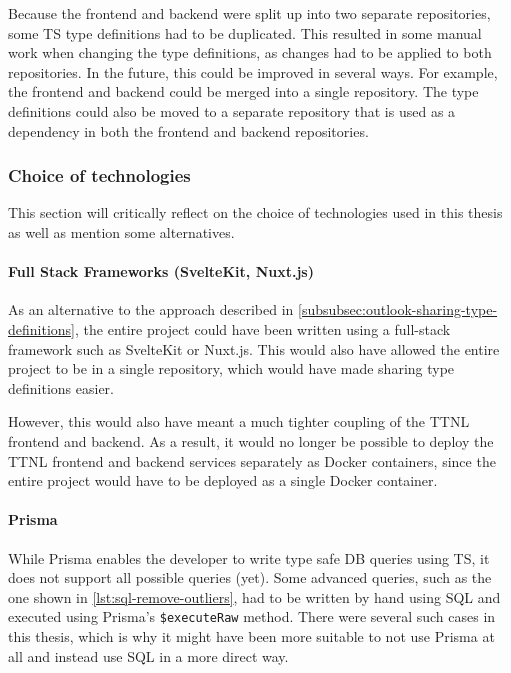 Because the frontend and backend were split up into two separate repositories, some \ac{TS} type definitions had to be duplicated.
This resulted in some manual work when changing the type definitions, as changes had to be applied to both repositories.
In the future, this could be improved in several ways.
For example, the frontend and backend could be merged into a single repository.
The type definitions could also be moved to a separate repository that is used as a dependency in both the frontend and backend repositories.

\subsubsection{Choice of technologies}

This section will critically reflect on the choice of technologies used in this thesis as well as mention some alternatives.

\paragraph{Full Stack Frameworks (SvelteKit, Nuxt.js)}

As an alternative to the approach described in \cref{subsubsec:outlook-sharing-type-definitions}, the entire project could have been written using a full-stack framework such as SvelteKit or Nuxt.js.
This would also have allowed the entire project to be in a single repository, which would have made sharing type definitions easier.

However, this would also have meant a much tighter coupling of the \ac{TTNL} frontend and backend.
As a result, it would no longer be possible to deploy the \ac{TTNL} frontend and backend services separately as Docker containers, since the entire project would have to be deployed as a single Docker container.

\paragraph{Prisma}

While Prisma enables the developer to write type safe \ac{DB} queries using \ac{TS}, it does not support all possible queries (yet).
Some advanced queries, such as the one shown in \cref{lst:sql-remove-outliers}, had to be written by hand using \ac{SQL} and executed using Prisma's \lstinline|$executeRaw| method.
There were several such cases in this thesis, which is why it might have been more suitable to not use Prisma at all and instead use \ac{SQL} in a more direct way.

